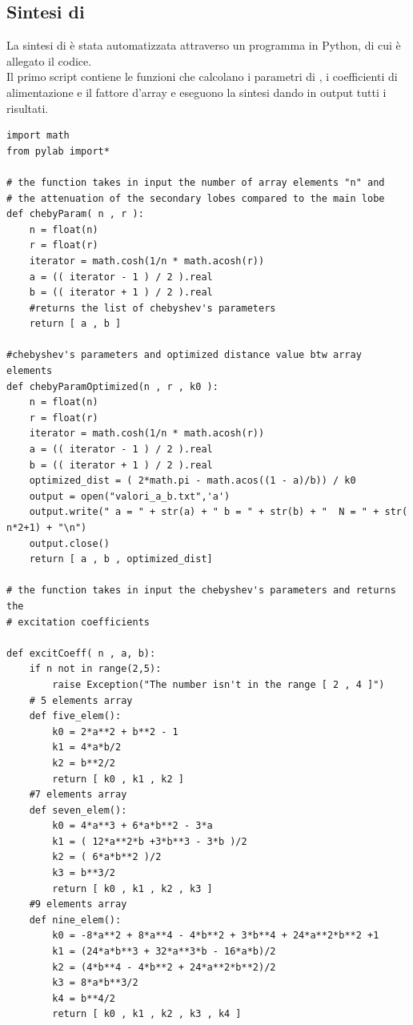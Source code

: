\subsection{Sintesi di \cheby}
La sintesi di \cheby è stata automatizzata attraverso un programma in Python, di cui è allegato il codice. \\[1cm]

Il primo script contiene le funzioni che calcolano i parametri di \cheby, i coefficienti di alimentazione e il fattore d'array e eseguono la sintesi dando in output tutti i risultati.
\begin{verbatim}
import math
from pylab import*

# the function takes in input the number of array elements "n" and 
# the attenuation of the secondary lobes compared to the main lobe
def chebyParam( n , r ):
    n = float(n)
    r = float(r)
    iterator = math.cosh(1/n * math.acosh(r))
    a = (( iterator - 1 ) / 2 ).real
    b = (( iterator + 1 ) / 2 ).real
    #returns the list of chebyshev's parameters
    return [ a , b ]

#chebyshev's parameters and optimized distance value btw array elements
def chebyParamOptimized(n , r , k0 ):
    n = float(n)
    r = float(r)
    iterator = math.cosh(1/n * math.acosh(r))
    a = (( iterator - 1 ) / 2 ).real
    b = (( iterator + 1 ) / 2 ).real
    optimized_dist = ( 2*math.pi - math.acos((1 - a)/b)) / k0
    output = open("valori_a_b.txt",'a')
    output.write(" a = " + str(a) + " b = " + str(b) + "  N = " + str( n*2+1) + "\n")
    output.close()
    return [ a , b , optimized_dist]

# the function takes in input the chebyshev's parameters and returns the 
# excitation coefficients

def excitCoeff( n , a, b):
    if n not in range(2,5):
        raise Exception("The number isn't in the range [ 2 , 4 ]")
    # 5 elements array
    def five_elem():
        k0 = 2*a**2 + b**2 - 1
        k1 = 4*a*b/2
        k2 = b**2/2
        return [ k0 , k1 , k2 ]
    #7 elements array
    def seven_elem():
        k0 = 4*a**3 + 6*a*b**2 - 3*a
        k1 = ( 12*a**2*b +3*b**3 - 3*b )/2
        k2 = ( 6*a*b**2 )/2
        k3 = b**3/2
        return [ k0 , k1 , k2 , k3 ]
    #9 elements array
    def nine_elem():
        k0 = -8*a**2 + 8*a**4 - 4*b**2 + 3*b**4 + 24*a**2*b**2 +1
        k1 = (24*a*b**3 + 32*a**3*b - 16*a*b)/2
        k2 = (4*b**4 - 4*b**2 + 24*a**2*b**2)/2
        k3 = 8*a*b**3/2
        k4 = b**4/2
        return [ k0 , k1 , k2 , k3 , k4 ]


\end{verbatim}
